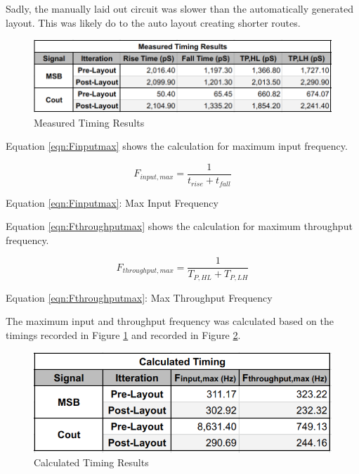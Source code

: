 \documentclass[11pt]{article}
\begin{document}
	Sadly, the manually laid out circuit was slower than the automatically generated layout. This was likely do to the auto layout creating shorter routes. 	

	\begin{figure}[H]
		\centering
		\includegraphics[width=0.7\linewidth]{"Pictures/Measured Timing Results"}
		\caption{Measured Timing Results}
		\label{fig:measured-timing-results}
	\end{figure}
		
	Equation \ref{eqn:Finputmax} shows the calculation for maximum input frequency.
	
	\begin{equation}\label{eqn:Finputmax}
		F_{input,max} = \frac{1}{t_{rise}+t_{fall}}
	\end{equation}
	\begin{center}
		Equation \ref{eqn:Finputmax}: Max Input Frequency
	\end{center}

	Equation \ref{eqn:Fthroughputmax} shows the calculation for maximum throughput frequency.
	
	
	\begin{equation}\label{eqn:Fthroughputmax}
		F_{throughput,max} = \frac{1}{T_{P,HL}+T_{P,LH}}
	\end{equation}
	\begin{center}
		Equation \ref{eqn:Fthroughputmax}: Max Throughput Frequency
	\end{center}
	
	The maximum input and throughput frequency was calculated based on the timings recorded in Figure \ref{fig:measured-timing-results} and recorded in Figure \ref{fig:calculated-timing-results}.
	
	\begin{figure}[H]
		\centering
		\includegraphics[width=0.7\linewidth]{"Pictures/Calculated Timing Results"}
		\caption{Calculated Timing Results}
		\label{fig:calculated-timing-results}
	\end{figure}
\end{document}
